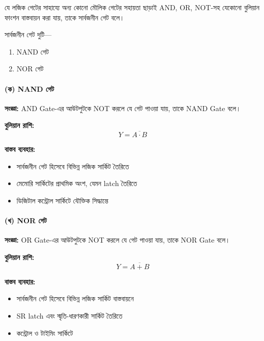 যে লজিক গেটের সাহায্যে অন্য কোনো মৌলিক গেটের সহায়তা ছাড়াই \textenglish{AND, OR, NOT}-সহ যেকোনো বুলিয়ান ফাংশন বাস্তবায়ন করা যায়, তাকে সার্বজনীন গেট বলে।

সার্বজনীন গেট দুটি—
\begin{enumerate}
    \item \textenglish{NAND} গেট
    \item \textenglish{NOR} গেট
\end{enumerate}

\paragraph{(ক) \textenglish{NAND} গেট}

\textbf{সংজ্ঞা:}
\textenglish{AND Gate}-এর আউটপুটকে \textenglish{NOT} করলে যে গেট পাওয়া যায়, তাকে \textenglish{NAND Gate} বলে।

\textbf{বুলিয়ান রাশি:}
\[
Y=\overline{A\cdot B}
\]

\textbf{বাস্তব ব্যবহার:}
\begin{itemize}[label={{\bulletfont\textbullet}}, leftmargin=*, nosep]
    \item সার্বজনীন গেট হিসেবে বিভিন্ন লজিক সার্কিট তৈরিতে
    \item মেমোরি সার্কিটের প্রাথমিক অংশ, যেমন \textenglish{latch} তৈরিতে
    \item ডিজিটাল কন্ট্রোল সার্কিটে যৌক্তিক সিদ্ধান্তে
\end{itemize}


\paragraph{(খ) \textenglish{NOR} গেট}

\textbf{সংজ্ঞা:}
\textenglish{OR Gate}-এর আউটপুটকে \textenglish{NOT} করলে যে গেট পাওয়া যায়, তাকে \textenglish{NOR Gate} বলে।

\textbf{বুলিয়ান রাশি:}
\[
Y=\overline{A+B}
\]

\textbf{বাস্তব ব্যবহার:}
\begin{itemize}[label={{\bulletfont\textbullet}}, leftmargin=*, nosep]
    \item সার্বজনীন গেট হিসেবে বিভিন্ন লজিক সার্কিট বাস্তবায়নে
    \item \textenglish{SR latch} এবং স্মৃতি-ধারণকারী সার্কিট তৈরিতে
    \item কন্ট্রোল ও টাইমিং সার্কিটে
\end{itemize}

